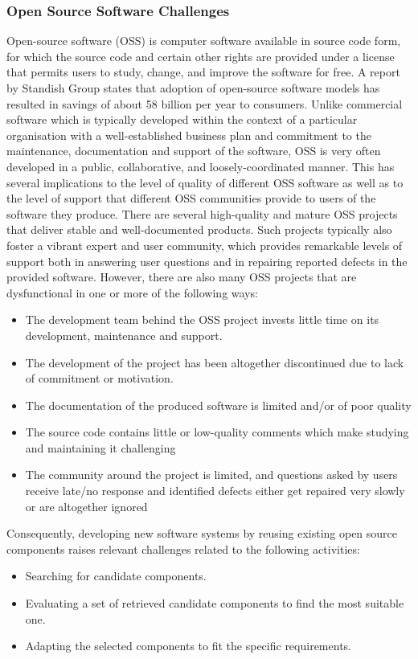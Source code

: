 \subsubsection{Open Source Software Challenges}
Open-source software (OSS) is computer software available in source code form, for which the source code and certain other rights are provided under a license that permits users to study, change, and improve the software for free. A report by Standish Group states that adoption of open-source software models has resulted in savings of about 58 billion per year to consumers. Unlike commercial software which is typically developed within the context of a particular organisation with a well-established business plan and commitment to the maintenance, documentation and support of the software, OSS is very often developed in a public, collaborative, and loosely-coordinated manner. This has several implications to the level of quality of different OSS software as well as to the level of support that different OSS communities provide to users of the software they produce.
There are several high-quality and mature OSS projects that deliver stable and well-documented products. Such projects typically also foster a vibrant expert and user community, which provides remarkable levels of support both in answering user questions and in repairing reported defects in the provided software. However, there are also many OSS projects that are dysfunctional in one or more of the following ways:
\begin{itemize}
	\item The development team behind the OSS project invests little time on its development, maintenance and support.
	\item The development of the project has been altogether discontinued due to lack of commitment or motivation.
	\item The documentation of the produced software is limited and/or of poor quality
	\item The source code contains little or low-quality comments which make studying and maintaining it challenging
	\item The community around the project is limited, and questions asked by users receive late/no response and identified defects either get repaired very slowly or are altogether ignored
\end{itemize}
Consequently, developing new software systems by reusing existing open source components raises relevant challenges related to the following activities:
\begin{itemize}
	\item Searching for candidate components.
	\item Evaluating a set of retrieved candidate components to find the most suitable one.
	\item Adapting the selected components to fit the specific requirements.
\end{itemize}


